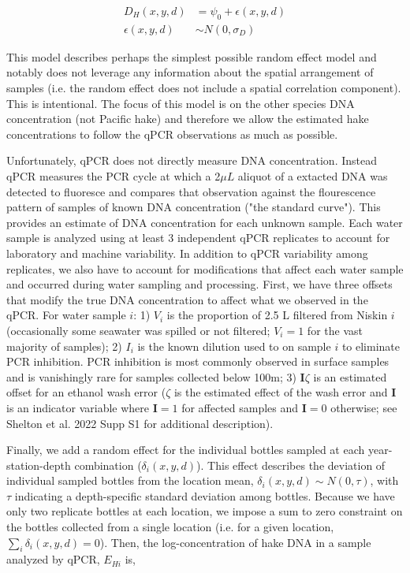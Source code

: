 \documentclass{article}
\begin{document}
\begin{align}
  D_H(x,y,d) &= \psi_0 + \epsilon(x,y,d) \\
  \epsilon(x,y,d) &\sim N(0,\sigma_D)
\end{align}

This model describes perhaps the simplest possible random effect model and notably does not leverage any information about the spatial arrangement of samples (i.e. the random effect does not include a spatial correlation component).  This is intentional.  The focus of this model is on the other species DNA concentration (not Pacific hake) and therefore we allow the estimated hake concentrations to follow the qPCR observations as much as possible. 

Unfortunately, qPCR does not directly measure DNA concentration. Instead qPCR measures the PCR cycle at which a 2$\mu L$ aliquot of a extacted DNA was detected to fluoresce and compares that observation against the flourescence pattern of samples of known DNA concentration ("the standard curve"). This provides an estimate of DNA concentration for each unknown sample. Each water sample is analyzed using at least 3 independent qPCR replicates to account for laboratory and machine variability. In addition to qPCR variability among replicates, we also have to account for modifications that affect each water sample and occurred during water sampling and processing. First, we have three offsets that modify the true DNA concentration to affect what we observed in the qPCR. For water sample $i$: 1) $V_i$ is the proportion of 2.5 L filtered from Niskin $i$ (occasionally some seawater was spilled or not filtered; $V_i =1$ for the vast majority of samples); 2) $I_i$ is the known dilution used to on sample $i$ to eliminate PCR inhibition. PCR inhibition is most commonly observed in surface samples and is vanishingly rare for samples collected below 100m; 3) $\mathbf{I}\zeta$ is an estimated offset for an ethanol wash error ($\zeta$ is the estimated effect of the wash error and $\mathbf{I}$ is an indicator variable where $\mathbf{I}=1$ for affected samples and $\mathbf{I}=0$ otherwise; see Shelton et al. 2022 Supp S1 for additional description).

Finally, we add a random effect for the individual bottles sampled at each year-station-depth combination ($\delta_i(x,y,d)$). This effect  describes the deviation of individual sampled bottles from the location mean, $\delta_i(x,y,d) \sim N(0,\tau)$, with $\tau$ indicating a depth-specific standard deviation among bottles. Because we have only two replicate bottles at each location, we impose a sum to zero constraint on the bottles collected from a single location (i.e. for a given location, $\sum_i \delta_i(x,y,d) = 0$). Then, the log-concentration of hake DNA in a sample analyzed by qPCR, $E_{Hi}$ is, 
\end{document}
